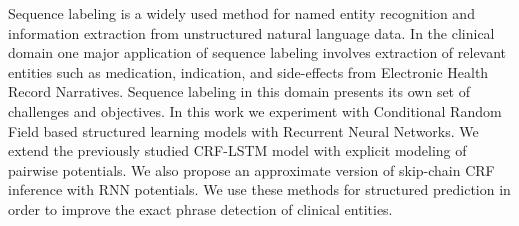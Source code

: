 Sequence labeling is a widely used method for named entity recognition and information extraction from unstructured natural language data. In the clinical domain one major application of sequence labeling involves extraction of relevant entities such as medication, indication, and side-effects from Electronic Health Record Narratives. Sequence labeling in this domain presents its own set of challenges and objectives. In this work we experiment with Conditional Random Field based structured learning models with Recurrent Neural Networks. We extend the previously studied CRF-LSTM model with explicit modeling of pairwise potentials. We also propose an approximate version of skip-chain CRF inference with RNN potentials. We use these methods for structured prediction in order to improve the exact phrase detection of clinical entities.
